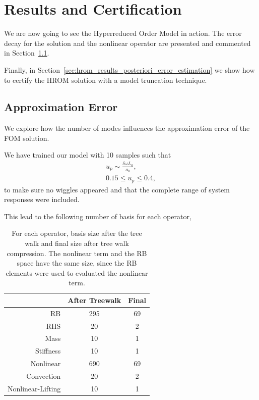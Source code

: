 \documentclass[../../thesis.tex]{subfiles}
\begin{document}
\section{Results and Certification}
\label{sec:results_and_certification}
We are now going to see the Hyperreduced Order Model in action.
The error decay for the solution and the nonlinear operator 
are presented and commented in Section~\ref{sec:hrom_results_reduced_basis}.

Finally, in Section~\ref{sec:hrom_results_posteriori_error_estimation} we show 
how to certify the HROM solution with a model truncation technique.  

\subsection{Approximation Error}
\label{sec:hrom_results_reduced_basis}
We explore how the number of modes influences the approximation error of the FOM solution.

We have trained our model with 10 samples such that
\begin{align*}
    u_p \sim \frac{\delta \omega L_0}{a_0},
    \nonumber
    \\
    0.15 \leq u_p \leq 0.4,
\end{align*}
to make sure no wiggles appeared and 
that the complete range of system responses were included.

This lead to the following number of basis for each operator,
\begin{table}[!h]
    \caption{For each operator,
    basis size after the tree walk and final size after tree walk compression.
    The nonlinear term and the RB space have the same size, 
    since the RB elements were used to evaluated the nonlinear term.}
    \centering
    \begin{tabular}{@{}rcc@{}}
    \toprule
                      & After Treewalk & Final \\ \midrule
    RB                & 295            & 69                \\
    RHS               & 20             & 2                 \\
    Mass              & 10             & 1                 \\
    Stiffness         & 10             & 1                 \\
    Nonlinear         & 690            & 69                \\
    Convection        & 20             & 2                 \\
    Nonlinear-Lifting & 10             & 1                 \\ \bottomrule
    \end{tabular}
\end{table}
\end{document}
